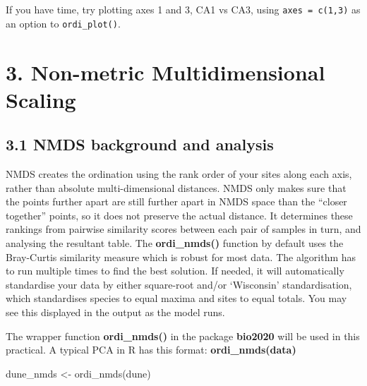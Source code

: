 \documentclass[
]{article}
\newenvironment{Shaded}{\begin{snugshade}}{\end{snugshade}}
\newcommand{\FunctionTok}[1]{\textcolor[rgb]{0.00,0.00,0.00}{#1}}
\newcommand{\NormalTok}[1]{#1}
\newcommand{\OtherTok}[1]{\textcolor[rgb]{0.56,0.35,0.01}{#1}}
\begin{document}
If you have time, try plotting axes 1 and 3, CA1 vs CA3, using
\texttt{axes\ =\ c(1,3)} as an option to \texttt{ordi\_plot()}.

\hypertarget{non-metric-multidimensional-scaling}{%
\section{3. Non-metric Multidimensional
Scaling}\label{non-metric-multidimensional-scaling}}

\hypertarget{nmds-background-and-analysis}{%
\subsection{3.1 NMDS background and
analysis}\label{nmds-background-and-analysis}}

NMDS creates the ordination using the rank order of your sites along
each axis, rather than absolute multi-dimensional distances. NMDS only
makes sure that the points further apart are still further apart in NMDS
space than the ``closer together'' points, so it does not preserve the
actual distance. It determines these rankings from pairwise similarity
scores between each pair of samples in turn, and analysing the resultant
table. The \textbf{ordi\_nmds()} function by default uses the
Bray-Curtis similarity measure which is robust for most data. The
algorithm has to run multiple times to find the best solution. If
needed, it will automatically standardise your data by either
square-root and/or `Wisconsin' standardisation, which standardises
species to equal maxima and sites to equal totals. You may see this
displayed in the output as the model runs.

The wrapper function \textbf{ordi\_nmds()} in the package
\textbf{bio2020} will be used in this practical. A typical PCA in R has
this format: \textbf{ordi\_nmds(data)}

\begin{Shaded}
\begin{Highlighting}[]
\NormalTok{dune\_nmds }\OtherTok{\textless{}{-}} \FunctionTok{ordi\_nmds}\NormalTok{(dune)}
\end{Highlighting}
\end{Shaded}
\end{document}
